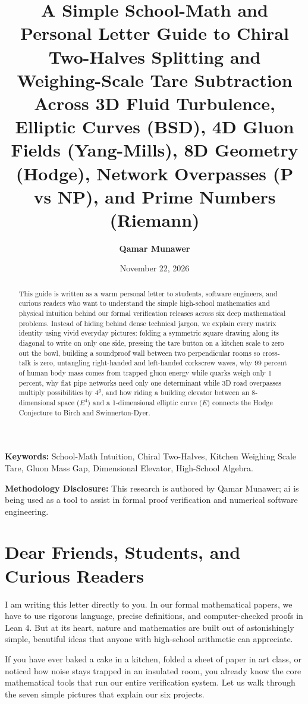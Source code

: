 \documentclass[11pt,a4paper]{article}
\title{\textbf{A Simple School-Math and Personal Letter Guide to Chiral Two-Halves Splitting and Weighing-Scale Tare Subtraction Across 3D Fluid Turbulence, Elliptic Curves (BSD), 4D Gluon Fields (Yang-Mills), 8D Geometry (Hodge), Network Overpasses (P vs NP), and Prime Numbers (Riemann)}}
\author{\textbf{Qamar Munawer}}
\date{November 22, 2026}
\begin{document}
\maketitle

\begin{abstract}
This guide is written as a warm personal letter to students, software engineers, and curious readers who want to understand the simple high-school mathematics and physical intuition behind our formal verification releases across six deep mathematical problems. Instead of hiding behind dense technical jargon, we explain every matrix identity using vivid everyday pictures: folding a symmetric square drawing along its diagonal to write on only one side, pressing the tare button on a kitchen scale to zero out the bowl, building a soundproof wall between two perpendicular rooms so cross-talk is zero, untangling right-handed and left-handed corkscrew waves, why 99 percent of human body mass comes from trapped gluon energy while quarks weigh only 1 percent, why flat pipe networks need only one determinant while 3D road overpasses multiply possibilities by $4^g$, and how riding a building elevator between an 8-dimensional space ($E^4$) and a 1-dimensional elliptic curve ($E$) connects the Hodge Conjecture to Birch and Swinnerton-Dyer.
\end{abstract}

\vspace{0.5em}
\noindent\textbf{Keywords:} School-Math Intuition, Chiral Two-Halves, Kitchen Weighing Scale Tare, Gluon Mass Gap, Dimensional Elevator, High-School Algebra.

\vspace{0.5em}
\noindent\textbf{Methodology Disclosure:} This research is authored by Qamar Munawer; ai is being used as a tool to assist in formal proof verification and numerical software engineering.

\section*{Dear Friends, Students, and Curious Readers}

I am writing this letter directly to you. In our formal mathematical papers, we have to use rigorous language, precise definitions, and computer-checked proofs in Lean 4. But at its heart, nature and mathematics are built out of astonishingly simple, beautiful ideas that anyone with high-school arithmetic can appreciate.

If you have ever baked a cake in a kitchen, folded a sheet of paper in art class, or noticed how noise stays trapped in an insulated room, you already know the core mathematical tools that run our entire verification system. Let us walk through the seven simple pictures that explain our six projects.
\end{document}
